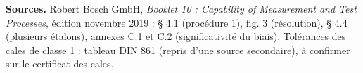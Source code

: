 \documentclass[10pt,a4paper]{article}
\begin{document}
\vfill
{\footnotesize\color{uimm}\textbf{Sources.} Robert Bosch GmbH, \emph{Booklet 10 : Capability of Measurement and Test Processes}, édition novembre 2019 : § 4.1 (procédure 1), fig. 3 (résolution), § 4.4 (plusieurs étalons), annexes C.1 et C.2 (significativité du biais). Tolérances des cales de classe 1 : tableau DIN 861 (repris d'une source secondaire), à confirmer sur le certificat des cales.}
\end{document}
